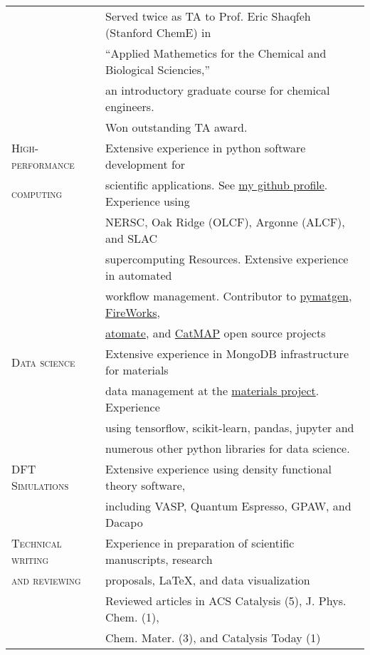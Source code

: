\documentclass[a4paper,10pt]{article}
\begin{document}
\begin{tabular}{ll}
 & Served twice as TA to Prof. Eric Shaqfeh (Stanford ChemE) in \\
 &``Applied Mathemetics for the Chemical and Biological Sciencies,'' \\
 &an introductory graduate course for chemical engineers. \\
 &Won outstanding TA award.\vspace{0.1in}\\
 \textsc{High-performance} & Extensive experience in python software development for \\ 
 \textsc{computing}  & scientific applications.  See \href{https://github.com/montoyjh}{my github profile}. Experience using\\
 & NERSC, Oak Ridge (OLCF), Argonne (ALCF), and SLAC \\
 &supercomputing Resources.  Extensive experience in automated \\
 &workflow management. Contributor to \href{pymatgen.org}{pymatgen}, \href{https://materialsproject.github.io/fireworks/}{FireWorks},\\
 &\href{https://hackingmaterials.github.io/atomate}{atomate}, and \href{http://catmap.readthedocs.io/en/latest/}{CatMAP} open source projects\vspace{0.1in}\\
 \textsc{Data science} & Extensive experience in MongoDB infrastructure for materials \\
 & data management at the \href{http://materialsproject.org}{materials project}.  Experience \\
 & using tensorflow, scikit-learn, pandas, jupyter and \\
 & numerous other python libraries for data science.\vspace{0.1in}\\
 \textsc{DFT Simulations} & Extensive experience using density functional theory software, \\
 & including VASP, Quantum Espresso, GPAW, and Dacapo \vspace{0.1in}\\
 \textsc{Technical writing} & Experience in preparation of scientific manuscripts, research \\
 \textsc{and reviewing} & proposals, \LaTeX, and data visualization \vspace{0.05in}\\
& Reviewed articles in ACS Catalysis (5), J. Phys. Chem. (1), \\
& Chem. Mater. (3), and Catalysis Today (1)
 \end{tabular}
\end{document}
